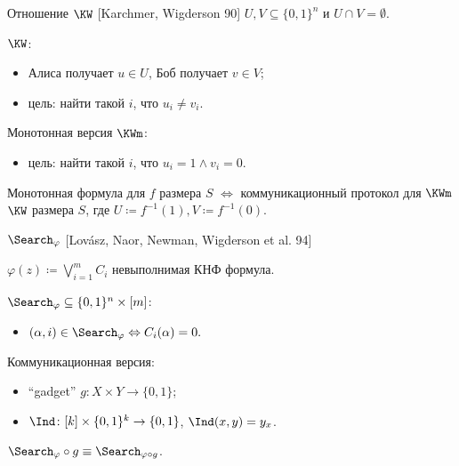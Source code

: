 \begin{frame}{Отношение $\KW$ [Karchmer, Wigderson 90]}
    $U, V \subseteq \{0, 1\}^{n}$ и $U \cap V = \emptyset$.

    \vspace{0.1cm}
    $\KW$:
    \begin{itemize}
        \item Алиса получает $u \in U$, Боб получает $v \in V$;
        \item цель: найти такой $i$, что $u_i \neq v_i$.
    \end{itemize}
    \pause
    Монотонная версия $\KWm$:
    \begin{itemize}
        \item цель: найти такой $i$, что $u_i = 1 \land v_i = 0$.
    \end{itemize}

    \pause

    \begin{theorem}
        \alert{Монотонная} формула для $f$ размера $S$ $\Leftrightarrow$ коммуникационный протокол для
        \alert{$\KWm$} $\KW$ размера $S$, где $U \coloneqq f^{-1}(1), V \coloneqq f^{-1}(0)$. 
    \end{theorem}
\end{frame}


\begin{frame}{$\Search_{\varphi}$ [Lov{\'{a}}sz, Naor, Newman, Wigderson et al. 94]}
    
    $\varphi(z) \coloneqq \bigvee\limits_{i = 1}^{m} C_i$ невыполнимая КНФ формула.
    \pause
    
    $\Search_{\varphi} \subseteq \{0, 1\}^n \times [m]$:
    \begin{itemize}
        \item $(\alpha, i) \in \Search_{\varphi} \Leftrightarrow C_{i}(\alpha) = 0.$
    \end{itemize}

    \pause
    \vspace{0.1cm}
    Коммуникационная версия:
    \begin{itemize}
        \item ``gadget'' $g\colon X \times Y \to \{0, 1\}$;
        \item $\Ind\colon [k] \times \{0, 1\}^k \to \{0, 1\}$, $\Ind(x, y) = y_x$.
    \end{itemize}

    \pause
    \begin{center}
        
    \end{center}


    $\Search_{\varphi} \circ g \equiv \Search_{\varphi \circ g}$.
\end{frame}

